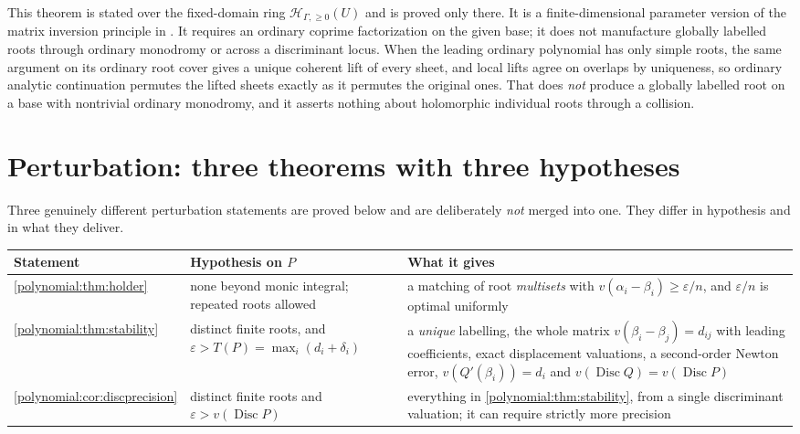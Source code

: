 \documentclass[11pt,letterpaper]{article}
\numberwithin{equation}{section}
\theoremstyle{definition}
\theoremstyle{remark}\newtheorem{remark}[theorem]{Remark}
\newcommand{\HHn}{\mathscr H_{\Gamma,\ge0}}
\newcommand{\Disc}{\operatorname{Disc}}
\begin{document}
This theorem is stated over the fixed-domain ring $\HHn(U)$ and is proved only
there. It is a finite-dimensional parameter version of the matrix inversion
principle in \cite{polynomial:SourceResearch}. It requires an ordinary coprime
factorization on the given base; it does not manufacture globally labelled
roots through ordinary monodromy or across a discriminant locus. When the
leading ordinary polynomial has only simple roots, the same argument on its
ordinary root cover gives a unique coherent lift of every sheet, and local
lifts agree on overlaps by uniqueness, so ordinary analytic continuation
permutes the lifted sheets exactly as it permutes the original ones. That does
\emph{not} produce a globally labelled root on a base with nontrivial ordinary
monodromy, and it asserts nothing about holomorphic individual roots through a
collision.

\section{Perturbation: three theorems with three hypotheses}
\label{polynomial:sec:stability}
Three genuinely different perturbation statements are proved below and are
deliberately \emph{not} merged into one. They differ in hypothesis and in what
they deliver.

\begin{center}
\begin{tabularx}{\textwidth}{@{}P{0.20\textwidth}P{0.26\textwidth}L@{}}
\toprule
Statement & Hypothesis on $P$ & What it gives\\
\midrule
\cref{polynomial:thm:holder} & none beyond monic integral; repeated roots
allowed & a matching of root \emph{multisets} with
$v(\alpha_i-\beta_i)\ge\varepsilon/n$, and $\varepsilon/n$ is optimal
uniformly\\[0.5em]
\cref{polynomial:thm:stability} & distinct finite roots, and
$\varepsilon>T(P)=\max_i(d_i+\delta_i)$ & a \emph{unique} labelling, the whole
matrix $v(\beta_i-\beta_j)=d_{ij}$ with leading coefficients, exact
displacement valuations, a second-order Newton error, $v(Q'(\beta_i))=d_i$ and
$v(\Disc Q)=v(\Disc P)$\\[0.5em]
\cref{polynomial:cor:discprecision} & distinct finite roots and
$\varepsilon>v(\Disc P)$ & everything in \cref{polynomial:thm:stability}, from
a single discriminant valuation; it can require strictly more precision\\
\bottomrule
\end{tabularx}
\end{center}
\end{document}
